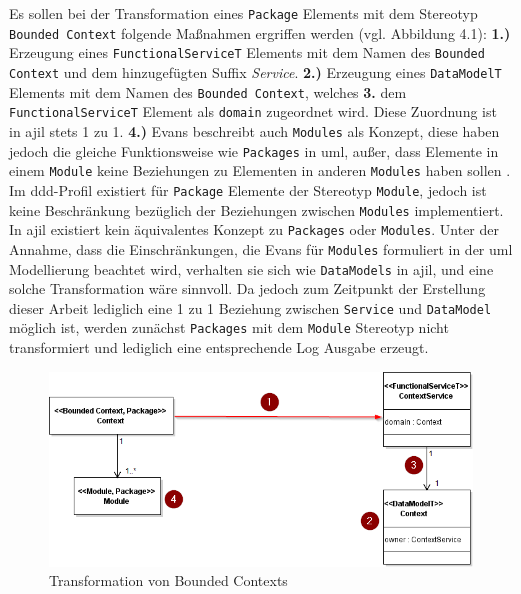 \documentclass[
	oneside,  %
	ngerman, 
	final, 
	11pt, 
	a4paper, 
	1.1headlines, 
	headinclude=false, 
	footinclude=false, 
	mpinclude=false, 
	pagesize, 
	onecolumn, 
	titlepage, 
	parskip=half, 
	headsepline, 
	chapterprefix=false, 
	version=first, 
	listof=totoc, 
	bibliography=totoc, 
	toc=graduated, 
	fleqn
]{scrbook}
\begin{document}
Es sollen bei der Transformation eines \texttt{Package} Elements mit dem Stereotyp \texttt{Bounded Context} folgende Maßnahmen ergriffen werden (vgl. Abbildung 4.1): \textbf{1.)} Erzeugung eines \texttt{FunctionalServiceT} Elements mit dem Namen des \texttt{Bounded Context} und dem hinzugefügten Suffix \textit{Service}. \textbf{2.)} Erzeugung eines \texttt{DataModelT} Elements mit dem Namen des \texttt{Bounded Context}, welches \textbf{3.} dem \texttt{FunctionalServiceT} Element als \texttt{domain} zugeordnet wird. Diese Zuordnung ist in \ac{ajil} stets 1 zu 1. \textbf{4.)} Evans beschreibt auch \texttt{Modules} als Konzept, diese haben jedoch die gleiche Funktionsweise wie  \texttt{Packages} in \ac{uml}, außer, dass Elemente in einem \texttt{Module} keine Beziehungen zu Elementen in anderen \texttt{Modules} haben sollen \cite{DDDEvans}. Im \ac{ddd}-Profil existiert für \texttt{Package} Elemente der Stereotyp \texttt{Module}, jedoch ist keine Beschränkung bezüglich der Beziehungen zwischen \texttt{Modules} implementiert. In \ac{ajil} existiert kein äquivalentes Konzept zu \texttt{Packages} oder \texttt{Modules}. Unter der Annahme, dass die Einschränkungen, die Evans für \texttt{Modules} formuliert in der \ac{uml} Modellierung beachtet wird, verhalten sie sich wie \texttt{DataModels} in \ac{ajil}, und eine solche Transformation wäre sinnvoll. Da jedoch zum Zeitpunkt der Erstellung dieser Arbeit lediglich eine 1 zu 1 Beziehung zwischen \texttt{Service} und \texttt{DataModel} möglich ist, werden zunächst \texttt{Packages} mit dem \texttt{Module} Stereotyp nicht transformiert und lediglich eine entsprechende Log Ausgabe erzeugt.
\begin{figure}
\includegraphics[width=\textwidth]{Bilder/boundedcontext_rules_explained.png}
\caption{Transformation von Bounded Contexts}
\end{figure}
\end{document}
